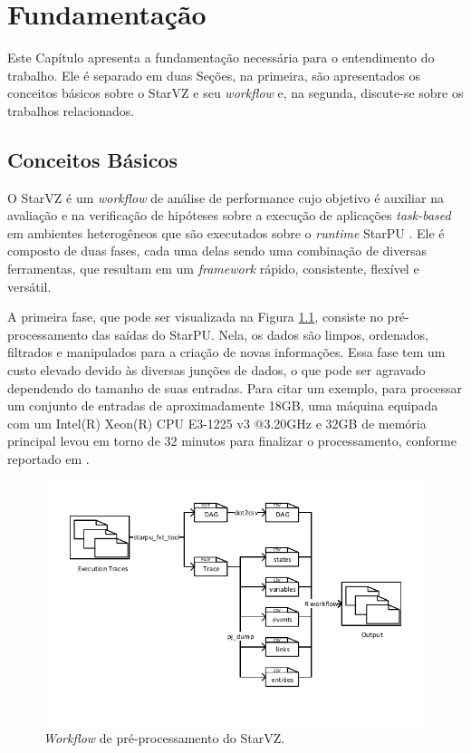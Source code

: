 
\chapter{Fundamentação} \label{ch:fundamentation}

Este Capítulo apresenta a fundamentação necessária para o entendimento do trabalho. 
Ele é separado em duas Seções, na primeira, são apresentados os conceitos básicos 
sobre o StarVZ e seu \emph{workflow} e, na segunda, discute-se sobre os trabalhos 
relacionados.

\section{Conceitos Básicos} \label{sect:basic-concepts}

O StarVZ \cite{ref:starvz} é um \emph{workflow} de análise de performance cujo 
objetivo é auxiliar na avaliação e na verificação de hipóteses sobre a execução de 
aplicações \emph{task-based} em ambientes heterogêneos que são executados sobre o
\emph{runtime} StarPU \cite{ref:starpu}. Ele é composto de duas fases, cada uma 
delas sendo uma combinação de diversas ferramentas, que resultam em um \emph{framework}
rápido, consistente, flexível e versátil.

A primeira fase, que pode ser visualizada na Figura \ref{fig:starvz-workflow1}, 
consiste no pré\hyp processamento das saídas do StarPU. Nela, os dados são 
limpos, ordenados, filtrados e manipulados para a criação de novas informações.
Essa fase tem um custo elevado devido às diversas junções de dados, o que pode 
ser agravado dependendo do tamanho de suas entradas. Para citar um exemplo, para 
processar um conjunto de entradas de aproximadamente 18GB, uma máquina equipada com 
um Intel(R) Xeon(R) CPU E3-1225 v3 @3.20GHz e 32GB de memória principal levou em torno 
de 32 minutos para finalizar o processamento, conforme reportado em \citet{ref:starvz}. 

\begin{figure}[h]
 \centerline{\includegraphics[width=1\textwidth]{./img/step1-final.pdf}}
 \caption{\emph{Workflow} de pré-processamento do StarVZ.}
 \label{fig:starvz-workflow1}
\end{figure}

